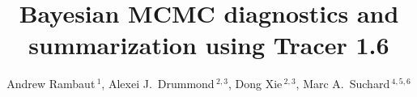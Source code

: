 \documentclass{bioinfo}
\begin{document}

\title[Tracer 1.6]{Bayesian MCMC diagnostics and summarization using Tracer 1.6}

\author[Rambaut \textit{et~al}]{ Andrew Rambaut\,$^{1}$, Alexei J.~Drummond\,$^{2,3}$, Dong Xie\,$^{2,3}$, Marc A.~Suchard\,$^{4,5,6}$}

\address{
$^{1}$Institute of Evolutionary Biology, University of Edinburgh, Edinburgh, UK\\
$^{2}$Department of Computer Science, University of Auckland, Auckland, NZ\\
$^{3}$Centre for Computational Evolution, University of Auckland, Auckland, NZ\\
$^{4,5}$Departments of Biomathematics and Human Genetics, David Geffen School of Medicine at UCLA, and \\
$^{6}$Department of Biostatistics, UCLA Fielding School of Public Health, University of California, Los Angeles, USA \\
}



\maketitle
\end{document}
